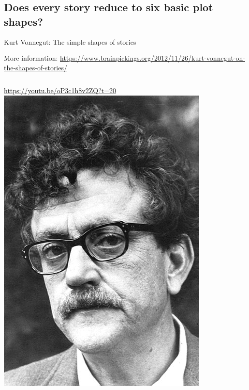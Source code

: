 \documentclass[aspectratio=169,usenames,dvipsnames]{beamer}
\begin{document}
\subsection{Does every story reduce to six basic plot shapes?}
\begin{frame}{Kurt Vonnegut: The simple shapes of stories}
    \begin{reference}
        More information:
        \url{https://www.brainpickings.org/2012/11/26/kurt-vonnegut-on-the-shapes-of-stories/}
    \end{reference}
    \begin{columns}
    \centering\large
    \url{https://youtu.be/oP3c1h8v2ZQ?t=20}
        \centering
        \includegraphics[height=0.5\textheight]{fig/vonnegut}
    \end{columns}
\end{frame}
\end{document}
